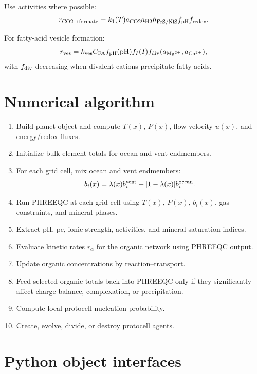 \documentclass[11pt]{article}
\newcommand{\ch}[1]{\ensuremath{\mathrm{#1}}}
\begin{document}
Use activities where possible:
\begin{equation}
r_{\ch{CO2}\rightarrow \ch{formate}}
=
k_1(T)
a_{\ch{CO2}}
a_{\ch{H2}}
h_{\rm FeS/NiS}
f_{\rm pH}
f_{\rm redox}.
\end{equation}

For fatty-acid vesicle formation:
\begin{equation}
r_{\rm ves}
=
k_{\rm ves}
C_{\rm FA}
f_{\rm pH}(\mathrm{pH})
f_I(I)
f_{\rm div}(a_{\ch{Mg^{2+}}},a_{\ch{Ca^{2+}}}),
\end{equation}
with $f_{\rm div}$ decreasing when divalent cations precipitate fatty acids.

\section{Numerical algorithm}

\begin{enumerate}
\item Build planet object and compute $T(x)$, $P(x)$, flow velocity $u(x)$, and energy/redox fluxes.
\item Initialize bulk element totals for ocean and vent endmembers.
\item For each grid cell, mix ocean and vent endmembers:
\begin{equation}
b_i(x)=\lambda(x)b_i^{\rm vent}+[1-\lambda(x)]b_i^{\rm ocean}.
\end{equation}
\item Run PHREEQC at each grid cell using $T(x)$, $P(x)$, $b_i(x)$, gas constraints, and mineral phases.
\item Extract $\mathrm{pH}$, $\mathrm{pe}$, ionic strength, activities, and mineral saturation indices.
\item Evaluate kinetic rates $r_\alpha$ for the organic network using PHREEQC output.
\item Update organic concentrations by reaction--transport.
\item Feed selected organic totals back into PHREEQC only if they significantly affect charge balance, complexation, or precipitation.
\item Compute local protocell nucleation probability.
\item Create, evolve, divide, or destroy protocell agents.
\end{enumerate}

\section{Python object interfaces}
\end{document}
